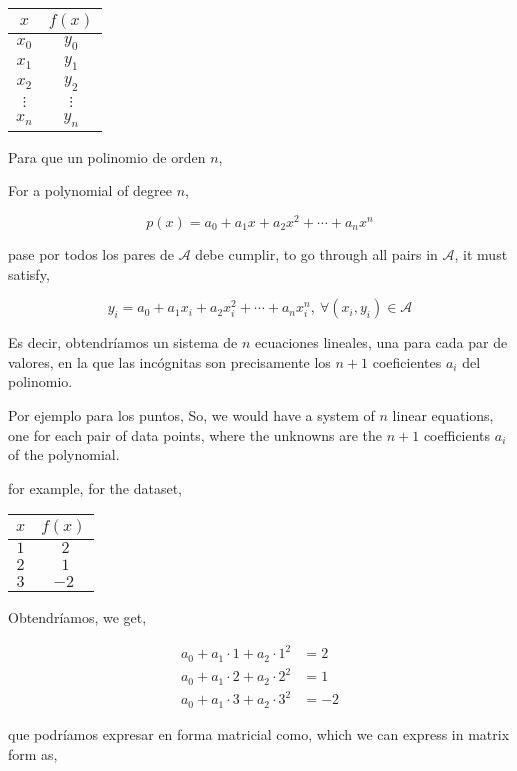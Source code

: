 \begin{table}[h]
\centering
\begin{tabular}{c|c}
$x$&$f(x)$\\ 
\hline
$x_0$& $y_0$\\
$x_1$&$y_1$\\
$x_2$&$y_2$\\
$\vdots$&$\vdots$\\
$x_n$&$y_n$
\end{tabular}
\label{tpuntos3}
\end{table}
\begin{paracol}{2}
Para que un polinomio de orden $n$,

\switchcolumn
For a polynomial of degree $n$,
\end{paracol}
\begin{equation*}
p(x)=a_0+a_1x+a_2x^2+\cdots+a_nx^n
\end{equation*}
\begin{paracol}{2}
pase por todos los pares de $\mathcal{A}$ debe cumplir,
\switchcolumn
to go through all pairs in $\mathcal{A}$, it must satisfy,
\end{paracol}
\begin{equation*}
y_i=a_0+a_1x_i+a_2x_i^2+\cdots+a_nx_i^n, \ \forall (x_i,y_i) \in \mathcal{A}
\end{equation*}
\begin{paracol}{2}
Es decir, obtendríamos un sistema de $n$ ecuaciones lineales, una para cada par de valores, en la que las incógnitas son precisamente los $n+1$ coeficientes $a_i$ del polinomio.

Por ejemplo para los puntos,
\switchcolumn
So, we would have a system of $n$ linear equations, one for each pair of data points, where the unknowns are the $n+1$ coefficients $a_i$ of the polynomial.

for example, for the dataset,  

\end{paracol}
\begin{table}[h]
\centering 
\begin{tabular}{c|c}
$x$&$f(x)$\\ 
\hline
$1$&$\ 2$\\
$2$&$ \ 1$\\
$3$&$-2$
\end{tabular}
\label{tpuntos4}
\end{table}
\begin{paracol}{2}
Obtendríamos,
\switchcolumn
we get,
\end{paracol}
\begin{align*}
a_0+a_1\cdot 1+ a_2\cdot 1^2&=2\\
a_0+a_1\cdot 2+ a_2\cdot 2^2&=1\\
a_0+a_1\cdot 3+ a_2\cdot 3^2&=-2
\end{align*}
\begin{paracol}{2}
que podríamos expresar en forma matricial como,
\switchcolumn
which we can express in matrix form as,
\end{paracol}

